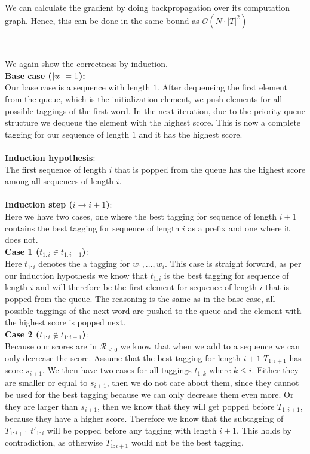 \documentclass[a4paper,12pt]{ETHexercise}
\begin{document}
\begin{question}
\begin{subquestion}
		We can calculate the gradient by doing backpropagation over its computation graph. Hence, this can be done in the same bound as $\mathcal{O}(N \cdot |T|^2)$
	\end{subquestion}
\end{question}
\begin{question}\\
	\begin{subquestion}
		We again show the correctness by induction.\\

		\textbf{Base case ($|\boldmath{w}|=1$):}\\
		Our base case is a sequence with length $1$. After dequeueing the first element from the queue, which is the initialization element, we push elements for all possible taggings of the first word. In the next iteration, due to the priority queue structure we dequeue the element with the highest score. This is now a complete tagging for our sequence of length $1$ and it has the highest score.\\\\
		\textbf{Induction hypothesis}:\\
		The first sequence of length $i$ that is popped from the queue has the highest score among all sequences of length $i$.\\\\
		\textbf{Induction step ($i \rightarrow i+1$)}:\\
		Here we have two cases, one where the best tagging for sequence of length $i+1$ contains the best tagging for sequence of length $i$ as a prefix and one where it does not.\\
		\textbf{Case 1 ($t_{1:i} \in t_{1:i+1}$)}:\\
		Here $t_{1:i}$ denotes the a tagging for $w_1, \dots, w_i$.
		This case is straight forward, as per our induction hypothesis we know that $t_{1:i}$ is the best tagging for sequence of length $i$ and will therefore be the first element for sequence of length $i$ that is popped from the queue. The reasoning is the same as in the base case, all possible taggings of the next word are pushed to the queue and the element with the highest score is popped next.\\
		\textbf{Case 2 ($t_{1:i} \notin t_{1:i+1}$)}:\\
		Because our scores are in $\mathcal{R}_{\leq 0}$ we know that when we add to a sequence we can only decrease the score. Assume that the best tagging for length $i+1$ $T_{1:i+1}$ has score $s_{i+1}$. We then have two cases for all taggings $t_{1:k}$ where $k \leq i$. Either they are smaller or equal to $s_{i+1}$, then we do not care about them, since they cannot be used for the best tagging because we can only decrease them even more. Or they are larger than $s_{i+1}$, then we know that they will get popped before $T_{1:i+1}$, because they have a higher score. Therefore we know that the subtagging of $T_{1:i+1}$ $t'_{1:i}$ will be popped before any tagging with length $i+1$. This holds by contradiction, as otherwise $T_{1:i+1}$ would not be the best tagging.

\end{subquestion}
\end{question}
\end{document}
